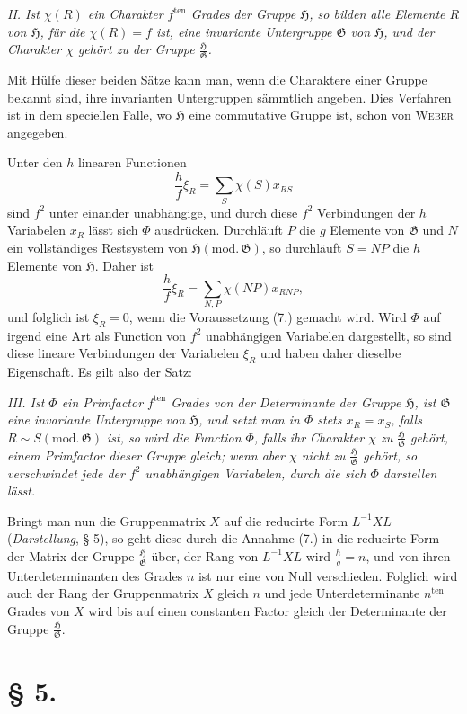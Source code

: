 \documentclass[11pt]{article}
\newcommand{\Hgr}{\mathfrak{H}}
\newcommand{\Ggr}{\mathfrak{G}}
\begin{document}
\emph{II. Ist $\chi(R)$ ein Charakter $f^{\mathrm{ten}}$ Grades der Gruppe $\Hgr$, so bilden alle Elemente $R$ von $\Hgr$, für die $\chi(R)=f$ ist, eine invariante Untergruppe $\Ggr$ von $\Hgr$, und der Charakter $\chi$ gehört zu der Gruppe $\frac{\Hgr}{\Ggr}$.}

Mit Hülfe dieser beiden Sätze kann man, wenn die Charaktere einer Gruppe bekannt sind, ihre invarianten Untergruppen sämmtlich angeben. Dies Verfahren ist in dem speciellen Falle, wo $\Hgr$ eine commutative Gruppe ist, schon von \textsc{Weber} angegeben.

Unter den $h$ linearen Functionen
\[
  \frac{h}{f}\xi_R=\sum_S\chi(S)x_{RS}
\]
sind $f^2$ unter einander unabhängige, und durch diese $f^2$ Verbindungen der $h$ Variabelen $x_R$ lässt sich $\Phi$ ausdrücken. Durchläuft $P$ die $g$ Elemente von $\Ggr$ und $N$ ein vollständiges Restsystem von $\Hgr(\mathrm{mod.}\,\Ggr)$, so durchläuft $S=NP$ die $h$ Elemente von $\Hgr$. Daher ist
\[
  \frac{h}{f}\xi_R=\sum_{N,P}\chi(NP)x_{RNP},
\]
und folglich ist $\xi_R=0$, wenn die Voraussetzung (7.) gemacht wird. Wird $\Phi$ auf irgend eine Art als Function von $f^2$ unabhängigen Variabelen dargestellt, so sind diese lineare Verbindungen der Variabelen $\xi_R$ und haben daher dieselbe Eigenschaft. Es gilt also der Satz:

\emph{III. Ist $\Phi$ ein Primfactor $f^{\mathrm{ten}}$ Grades von der Determinante der Gruppe $\Hgr$, ist $\Ggr$ eine invariante Untergruppe von $\Hgr$, und setzt man in $\Phi$ stets $x_R=x_S$, falls $R\sim S(\mathrm{mod.}\,\Ggr)$ ist, so wird die Function $\Phi$, falls ihr Charakter $\chi$ zu $\frac{\Hgr}{\Ggr}$ gehört, einem Primfactor dieser Gruppe gleich; wenn aber $\chi$ nicht zu $\frac{\Hgr}{\Ggr}$ gehört, so verschwindet jede der $f^2$ unabhängigen Variabelen, durch die sich $\Phi$ darstellen lässt.}

Bringt man nun die Gruppenmatrix $X$ auf die reducirte Form $L^{-1}XL$ (\emph{Darstellung}, § 5), so geht diese durch die Annahme (7.) in die reducirte Form der Matrix der Gruppe $\frac{\Hgr}{\Ggr}$ über, der Rang von $L^{-1}XL$ wird $\frac{h}{g}=n$, und von ihren Unterdeterminanten des Grades $n$ ist nur eine von Null verschieden. Folglich wird auch der Rang der Gruppenmatrix $X$ gleich $n$ und jede Unterdeterminante $n^{\mathrm{ten}}$ Grades von $X$ wird bis auf einen constanten Factor gleich der Determinante der Gruppe $\frac{\Hgr}{\Ggr}$.

\section*{§ 5.}
\end{document}
